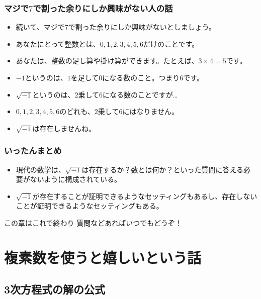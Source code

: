 \documentclass[dvipdfmx]{beamer}
\begin{document}
  \begin{frame}
    \frametitle{マジで$7$で割った余りにしか興味がない人の話}

    \begin{itemize}
      \item 続いて、マジで$7$で割った余りにしか興味がないとしましょう。
      \item あなたにとって整数とは、$0, 1, 2, 3, 4, 5, 6$だけのことです。
      \item あなたは、整数の足し算や掛け算ができます。たとえば、$3 \times 4 = 5$です。

      \pause

      \item $-1$というのは、$1$を足して$0$になる数のこと。つまり$6$です。
      \item $\sqrt{-1}$というのは、$2$乗して$6$になる数のことですが…
      \item $0, 1, 2, 3, 4, 5, 6$のどれも、$2$乗して$6$にはなりません。
      \item $\sqrt{-1}$は存在しませんね。
    \end{itemize}

  \end{frame}

  \begin{frame}
    \frametitle{いったんまとめ}

    \begin{itemize}
      \item 現代の数学は、$\sqrt{-1}$は存在するか？数とは何か？といった質問に答える必要がないように構成されている。
      \item $\sqrt{-1}$が存在することが証明できるようなセッティングもあるし、存在しないことが証明できるようなセッティングもある。
    \end{itemize}

    \begin{block}{この章はこれで終わり}
      質問などあればいつでもどうぞ！
    \end{block}

  \end{frame}

  \section{複素数を使うと嬉しいという話}

  \subsection{3次方程式の解の公式}
\end{document}
